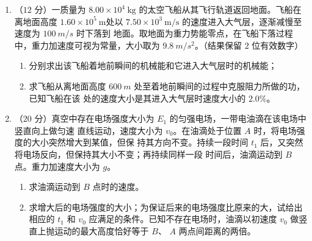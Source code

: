 \begin{enumerate}
\banswer{

}




\newpage
\item 
（$ 12 $ 分）一质量为 $8.00 \times 10^{4} \ \mathrm{kg}$ 的太空飞船从其飞行轨道返回地面。飞船在离地面高度
$1.60 \times 10^{5} \ \mathrm{m}$处以 $7.50 \times 10^{3} \ \mathrm{m} / \mathrm{s}$ 的速度进入大气层，逐渐减慢至速度为 $ 100 \ m/s $ 时下落到
地面。取地面为重力势能零点，在飞船下落过程中，重力加速度可视为常量，大小取为 $ 9.8 \ m/s^{2} $。（结果保留 $ 2 $ 位有效数字）
\begin{enumerate}
\renewcommand{\labelenumi}{\arabic{enumi}.}
\item
分别求出该飞船着地前瞬间的机械能和它进入大气层时的机械能；
\item 
求飞船从离地面高度 $ 600 \ m $ 处至着地前瞬间的过程中克服阻力所做的功，已知飞船在该
处的速度大小是其进入大气层时速度大小的 $ 2.0 \% $。




\end{enumerate}




\item 
（$ 20 $ 分）真空中存在电场强度大小为 $ E_{1} $ 的匀强电场，一带电油滴在该电场中竖直向上做匀速
直线运动，速度大小为 $ v_{0} $。在油滴处于位置 $ A $ 时，将电场强度的大小突然增大到某值，但保
持其方向不变。持续一段时间 $ t_{1} $ 后，又突然将电场反向，但保持其大小不变；再持续同样一段
时间后，油滴运动到 $ B $ 点。重力加速度大小为 $ g $。
\begin{enumerate}
\renewcommand{\labelenumi}{\arabic{enumi}.}
\item
求油滴运动到 $ B $ 点时的速度。
\item 
求增大后的电场强度的大小；为保证后来的电场强度比原来的大，试给出相应的 $ t_{1} $ 和 $ v_{0} $
应满足的条件。已知不存在电场时，油滴以初速度 $ v_{0} $ 做竖直上抛运动的最大高度恰好等于
$ B $、 $ A $ 两点间距离的两倍。





\end{enumerate}
\end{enumerate}
